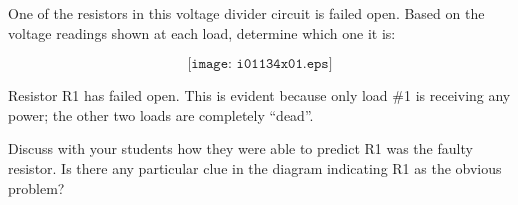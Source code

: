 

One of the resistors in this voltage divider circuit is failed open.  Based on the voltage readings shown at each load, determine which one it is:

$$\texttt{[image: i01134x01.eps]}$$







Resistor R1 has failed open.  This is evident because only load \#1 is receiving any power; the other two loads are completely ``dead''.







Discuss with your students how they were able to predict R1 was the faulty resistor.  Is there any particular clue in the diagram indicating R1 as the obvious problem?




